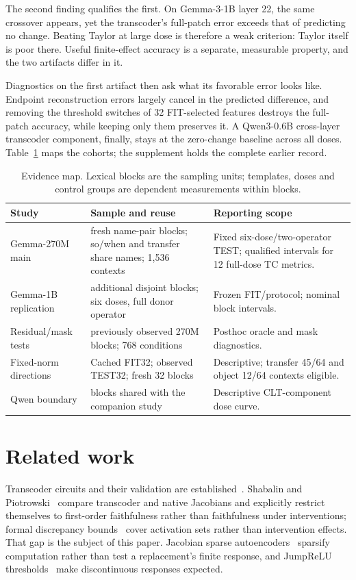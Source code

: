 \documentclass[11pt]{article}
\begin{document}
The second finding qualifies the first. On Gemma-3-1B layer 22, the same crossover appears, yet the transcoder's full-patch error exceeds that of predicting no change. Beating Taylor at large dose is therefore a weak criterion: Taylor itself is poor there. Useful finite-effect accuracy is a separate, measurable property, and the two artifacts differ in it.

Diagnostics on the first artifact then ask what its favorable error looks like. Endpoint reconstruction errors largely cancel in the predicted difference, and removing the threshold switches of 32 FIT-selected features destroys the full-patch accuracy, while keeping only them preserves it. A Qwen3-0.6B cross-layer transcoder component, finally, stays at the zero-change baseline across all doses. Table~\ref{tab:scope} maps the cohorts; the supplement holds the complete earlier record.

\begin{table}[ht]\centering\scriptsize
\setlength{\tabcolsep}{4pt}
\begin{tabular}{>{\raggedright\arraybackslash}p{}>{\raggedright\arraybackslash}p{}>{\raggedright\arraybackslash}p{}}\toprule
Study & Sample and reuse & Reporting scope\\\midrule
Gemma-270M main & 256 fresh name-pair blocks; so/when and transfer share names; 1,536 contexts & Fixed six-dose/two-operator TEST; qualified intervals for 12 full-dose TC metrics.\\[3pt]
Gemma-1B replication & 256 additional disjoint blocks; six doses, full donor operator & Frozen FIT/protocol; nominal block intervals.\\[3pt]
Residual/mask tests & 32 previously observed 270M blocks; 768 conditions & Posthoc oracle and mask diagnostics.\\[3pt]
Fixed-norm directions & Cached FIT32; observed TEST32; fresh 32 blocks & Descriptive; transfer 45/64 and object 12/64 contexts eligible.\\[3pt]
Qwen boundary & 256 blocks shared with the companion study & Descriptive CLT-component dose curve.\\\bottomrule
\end{tabular}
\caption{Evidence map. Lexical blocks are the sampling units; templates, doses and control groups are dependent measurements within blocks.}\label{tab:scope}
\end{table}

\section{Related work}
Transcoder circuits and their validation are established~\cite{dunefsky2024,ameisen2025}. Shabalin and Piotrowski~\cite{shabalin2026} compare transcoder and native Jacobians and explicitly restrict themselves to first-order faithfulness rather than faithfulness under interventions; formal discrepancy bounds~\cite{ladner2026} cover activation sets rather than intervention effects. That gap is the subject of this paper. Jacobian sparse autoencoders~\cite{farnik2025} sparsify computation rather than test a replacement's finite response, and JumpReLU thresholds~\cite{rajamanoharan2024} make discontinuous responses expected.
\end{document}
